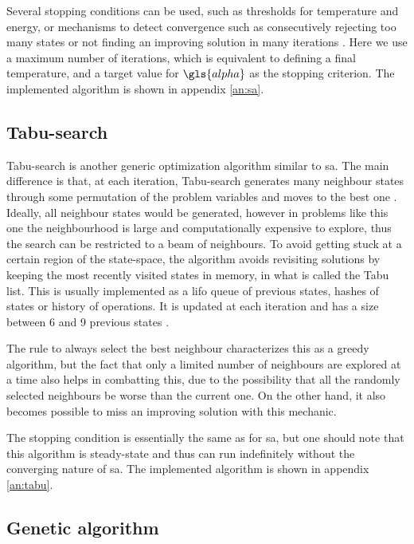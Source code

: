 \documentclass[main.tex]{subfiles}
\begin{document}
Several stopping conditions can be used, such as thresholds for temperature and energy, or mechanisms to detect convergence such as consecutively rejecting too many states or not finding an improving solution in many iterations \cite{orsila2008best}.
Here we use a maximum number of iterations, which is equivalent to defining a final temperature, and a target value for $\gls{alpha}$ as the stopping criterion.
The implemented algorithm is shown in appendix \ref{an:sa}.

\subsection{Tabu-search}

Tabu-search is another generic optimization algorithm similar to \gls{sa}.
The main difference is that, at each iteration, Tabu-search generates many neighbour states through some permutation of the problem variables and moves to the best one \cite{glover1998tabu}.
Ideally, all neighbour states would be generated, however in problems like this one the neighbourhood is large and computationally expensive to explore, thus the search can be restricted to a beam of neighbours.
To avoid getting stuck at a certain region of the state-space, the algorithm avoids revisiting solutions by keeping the most recently visited states in memory, in what is called the Tabu list.
This is usually implemented as a \gls{lifo} queue of previous states, hashes of states or history of operations.
It is updated at each iteration and has a size between 6 and 9 previous states \cite{pinedo2008scheduling}.

The rule to always select the best neighbour characterizes this as a greedy algorithm, but the fact that only a limited number of neighbours are explored at a time also helps in combatting this, due to the possibility that all the randomly selected neighbours be worse than the current one.
On the other hand, it also becomes possible to miss an improving solution with this mechanic.

The stopping condition is essentially the same as for \gls{sa}, but one should note that this algorithm is steady-state and thus can run indefinitely without the converging nature of \gls{sa}.
The implemented algorithm is shown in appendix \ref{an:tabu}.

\subsection{Genetic algorithm}
\end{document}
